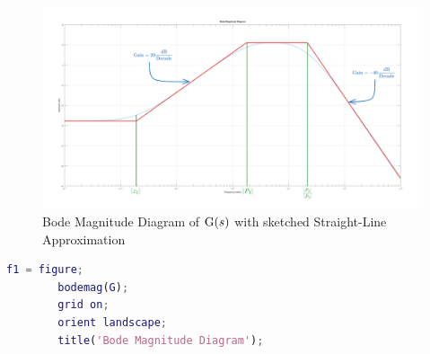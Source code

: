 \begin{hwkProblem}{4}{}
	\begin{figure}[H]
		\begin{center}
			\includegraphics[width=\textwidth]{./images/s04b.png}
		\end{center}
		\caption{Bode Magnitude Diagram of \( \func{G}[s] \) with sketched Straight-Line Approximation}\label{fig:s04b}
	\end{figure}

	\hwkCode{}

	\begin{lstlisting}[language={matlab}, label={lst:s04}, caption={\lstinline{MATLAB} code for P04}]
		f1 = figure;
		bodemag(G);
		grid on;
		orient landscape;
		title('Bode Magnitude Diagram');
	\end{lstlisting}
	
\end{hwkProblem}



